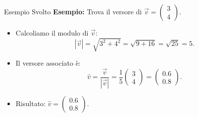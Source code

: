 \documentclass{beamer}
\begin{document}
\begin{frame}{Esempio Svolto}
    \textbf{Esempio:} Trova il versore di $\vec{v} =
    \begin{pmatrix}
        3 \\
        4
    \end{pmatrix}$.
    \begin{itemize}
        \item Calcoliamo il modulo di $\vec{v}$:
        \[
        |\vec{v}| = \sqrt{3^2 + 4^2} = \sqrt{9 + 16} = \sqrt{25} = 5.
        \]
        \item Il versore associato è:
        \[
        \hat{v} = \frac{\vec{v}}{|\vec{v}|} =
        \frac{1}{5}
        \begin{pmatrix}
            3 \\
            4
        \end{pmatrix}
        =
        \begin{pmatrix}
            0.6 \\
            0.8
        \end{pmatrix}.
        \]
        \item Risultato: $\hat{v} =
        \begin{pmatrix}
            0.6 \\
            0.8
        \end{pmatrix}$.
    \end{itemize}
\end{frame}
\end{document}
